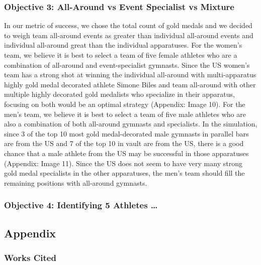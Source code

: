 \documentclass[
  letterpaper,
  DIV=11,
  numbers=noendperiod]{scrartcl}
\begin{document}
\hypertarget{objective-3-all-around-vs-event-specialist-vs-mixture}{%
\subsubsection{Objective 3: All-Around vs Event Specialist vs
Mixture}\label{objective-3-all-around-vs-event-specialist-vs-mixture}}

In our metric of success, we chose the total count of gold medals and we
decided to weigh team all-around events as greater than individual
all-around events and individual all-around great than the individual
apparatuses. For the women's team, we believe it is best to select a
team of five female athletes who are a combination of all-around and
event-specialist gymnasts. Since the US women's team has a strong shot
at winning the individual all-around with multi-apparatus highly gold
medal decorated athlete Simone Biles and team all-around with other
multiple highly decorated gold medalists who specialize in their
apparatus, focusing on both would be an optimal strategy (Appendix:
Image 10). For the men's team, we believe it is best to select a team of
five male athletes who are also a combination of both all-around
gymnasts and specialists. In the simulation, since 3 of the top 10 most
gold medal-decorated male gymnasts in parallel bars are from the US and
7 of the top 10 in vault are from the US, there is a good chance that a
male athlete from the US may be successful in those apparatuses
(Appendix: Image 11). Since the US does not seem to have very many
strong gold medal specialists in the other apparatuses, the men's team
should fill the remaining positions with all-around gymnasts.

\hypertarget{objective-4-identifying-5-athletes}{%
\subsubsection{Objective 4: Identifying 5 Athletes
\ldots{}}\label{objective-4-identifying-5-athletes}}

\newpage

\hypertarget{appendix}{%
\subsection{Appendix}\label{appendix}}

\hypertarget{works-cited}{%
\subsubsection{Works Cited}\label{works-cited}}
\end{document}
